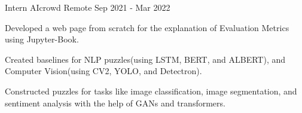 

\begin{cventries}

%
 
  \cventry
      {Intern} %
      {AIcrowd} %
      {Remote} %
      {Sep 2021 - Mar 2022} %
      {
        \begin{cvitems} %
        \item {Developed a web page from scratch for the explanation of Evaluation Metrics using Jupyter-Book.}
        \item{Created baselines for NLP puzzles(using LSTM, BERT, and ALBERT), and Computer Vision(using CV2, YOLO, and Detectron).}
        \item {Constructed puzzles for tasks like image classification, image segmentation, and sentiment analysis with the help of GANs and transformers.}
        \end{cvitems}
      }


\end{cventries}
